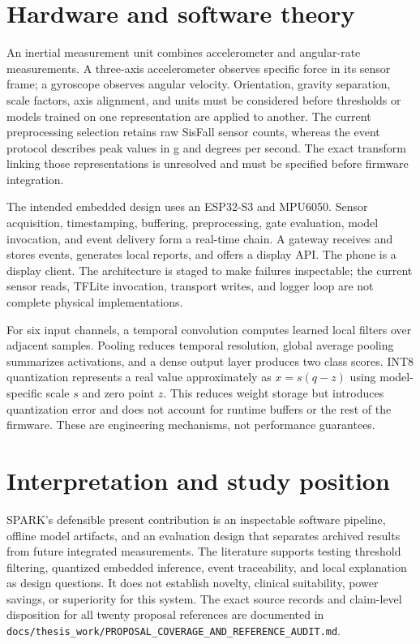 \section{Hardware and software theory}
An inertial measurement unit combines accelerometer and angular-rate measurements. A three-axis accelerometer observes specific force in its sensor frame; a gyroscope observes angular velocity. Orientation, gravity separation, scale factors, axis alignment, and units must be considered before thresholds or models trained on one representation are applied to another. The current preprocessing selection retains raw SisFall sensor counts, whereas the event protocol describes peak values in g and degrees per second. The exact transform linking those representations is unresolved and must be specified before firmware integration.

The intended embedded design uses an ESP32-S3 and MPU6050. Sensor acquisition, timestamping, buffering, preprocessing, gate evaluation, model invocation, and event delivery form a real-time chain. A gateway receives and stores events, generates local reports, and offers a display API. The phone is a display client. The architecture is staged to make failures inspectable; the current sensor reads, TFLite invocation, transport writes, and logger loop are not complete physical implementations.

For six input channels, a temporal convolution computes learned local filters over adjacent samples. Pooling reduces temporal resolution, global average pooling summarizes activations, and a dense output layer produces two class scores. INT8 quantization represents a real value approximately as $x=s(q-z)$ using model-specific scale $s$ and zero point $z$. This reduces weight storage but introduces quantization error and does not account for runtime buffers or the rest of the firmware. These are engineering mechanisms, not performance guarantees.

\section{Interpretation and study position}
SPARK's defensible present contribution is an inspectable software pipeline, offline model artifacts, and an evaluation design that separates archived results from future integrated measurements. The literature supports testing threshold filtering, quantized embedded inference, event traceability, and local explanation as design questions. It does not establish novelty, clinical suitability, power savings, or superiority for this system. The exact source records and claim-level disposition for all twenty proposal references are documented in \texttt{docs/thesis\_work/PROPOSAL\_COVERAGE\_AND\_REFERENCE\_AUDIT.md}.
